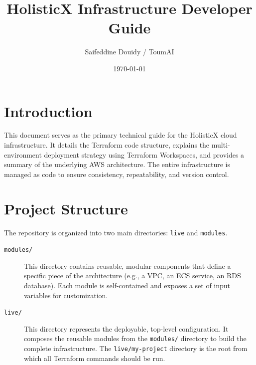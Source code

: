 \documentclass[a4paper,11pt]{article}
\title{\textbf{HolisticX Infrastructure Developer Guide}}
\author{Saifeddine Douidy / ToumAI}
\date{\today}
\begin{document}
\maketitle
\thispagestyle{empty}
\tableofcontents
\newpage

\section{Introduction}
This document serves as the primary technical guide for the HolisticX cloud infrastructure. It details the Terraform code structure, explains the multi-environment deployment strategy using Terraform Workspaces, and provides a summary of the underlying AWS architecture. The entire infrastructure is managed as code to ensure consistency, repeatability, and version control.

\section{Project Structure}
The repository is organized into two main directories: \texttt{live} and \texttt{modules}.

\begin{description}
    \item[\texttt{modules/}] This directory contains reusable, modular components that define a specific piece of the architecture (e.g., a VPC, an ECS service, an RDS database). Each module is self-contained and exposes a set of input variables for customization.
    \item[\texttt{live/}] This directory represents the deployable, top-level configuration. It composes the reusable modules from the \texttt{modules/} directory to build the complete infrastructure. The \texttt{live/my-project} directory is the root from which all Terraform commands should be run.
\end{description}
\end{document}
